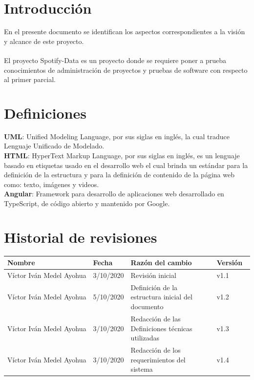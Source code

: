 \documentclass[12pt,a4paper]{book}
\date{\today}
\begin{document}
 	

\tableofcontents
\newpage
\section{Introducción}
\vspace{0.5 cm}
En el presente documento se identifican los aspectos correspondientes a la visión y alcance de este proyecto.\\
\\ El proyecto Spotify-Data es un proyecto donde se requiere poner a prueba conocimientos de administración de proyectos y pruebas de software con respecto al primer parcial.
		
\section{Definiciones}
\vspace{0.5 cm}
\textbf {UML}: Unified Modeling Language, por sus siglas en inglés, la cual traduce
Lenguaje Unificado de Modelado.\\

\textbf {HTML}: HyperText Markup Language, por sus siglas en inglés, es un lenguaje
basado en etiquetas usado en el desarrollo web el cual brinda un estándar para
la definición de la estructura y para la definición de contenido de la página web
como: texto, imágenes y videos.\\

\textbf {Angular}: Framework para desarrollo de aplicaciones web desarrollado en TypeScript, de código abierto y mantenido por Google.\\

\section{Historial de revisiones}
\vspace{0.5 cm}
\begin{table}[h!]
\centering
\begin{tabular}{|p{0.35\linewidth}|p{0.15\linewidth}|p{0.35\linewidth}|p{0.15\linewidth}|}
\hline
\textbf{Nombre}&\textbf{Fecha}&\textbf{Razón del cambio}&\textbf{Versión}
\\\hline
Víctor Iván Medel Ayohua&3/10/2020&Revisión inicial&v1.1\\\hline
Víctor Iván Medel Ayohua&5/10/2020&Definición de la estructura inicial del documento&v1.2\\\hline
Víctor Iván Medel Ayohua&3/10/2020&Redacción de las Definiciones técnicas utilizadas&v1.3\\\hline
Víctor Iván Medel Ayohua&3/10/2020&Redacción de los requerimientos del sistema&v1.4\\\hline
\end{tabular}
\end{table}
\end{document}
